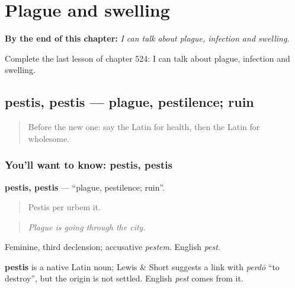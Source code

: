 
\chapter{Plague and swelling}
\label{ch:la-plague-and-swelling}

\begin{chapteropening}
\textbf{By the end of this chapter:} \emph{I can talk about plague, infection and swelling.}

Complete the last lesson of chapter 524: I can talk about plague, infection and swelling.
\end{chapteropening}

\section[pestis, pestis]{pestis, pestis — plague, pestilence; ruin}

\label{lesson:LA-C524-pestis}



\begin{quote}
Before the new one: say the Latin for health, then the Latin for wholesome.
\end{quote}

\subsection*{You'll want to know: pestis, pestis}
\textbf{pestis, pestis} — \textquotedblleft{}plague, pestilence; ruin\textquotedblright{}.

\begin{quote}
Pestis per urbem it.
\end{quote}

\begin{quote}
\emph{Plague is going through the city.}
\end{quote}

Feminine, third declension; accusative \emph{pestem}. English \emph{pest}.

\begin{cousinweb}
\textbf{pestis} is a native Latin noun; Lewis \& Short suggests a link with \emph{perdō} \textquotedblleft{}to destroy\textquotedblright{}, but the origin is not settled. English \emph{pest} comes from it.
\end{cousinweb}

